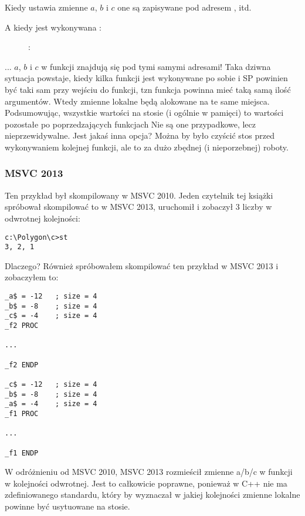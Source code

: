 Kiedy  ustawia zmienne $a$, $b$ i $c$ one są zapisywane pod adresem , itd.

\clearpage
A kiedy jest wykonywana :

\begin{figure}[H]
\centering
{}
\caption{\olly: }
\label{fig:stack_noise_olly2}
\end{figure}

... $a$, $b$ i $c$ w funkcji  znajdują się pod tymi samymi adresami!
Taka dziwna sytuacja powstaje, kiedy kilka funkcji jest wykonywane po sobie
i \ac{SP} powinien być taki sam przy wejściu do funkcji, tzn funkcja powinna mieć taką samą ilość argumentów. 
Wtedy zmienne lokalne będą alokowane na te same miejsca.
Podsumowując, wszystkie wartości na stosie (i ogólnie w pamięci) to wartości pozostałe po poprzedzających funkcjach
Nie są one przypadkowe, lecz nieprzewidywalne.
Jest jakaś inna opcja?
Można by było czyścić stos przed wykonywaniem kolejnej funkcji,
ale to za dużo zbędnej (i nieporzebnej) roboty.

\subsubsection{MSVC 2013}

Ten przykład był skompilowany w MSVC 2010.
Jeden czytelnik tej książki spróbował skompilować to w MSVC 2013, uruchomił i zobaczył 3 liczby w odwrotnej kolejności:

\begin{lstlisting}
c:\Polygon\c>st
3, 2, 1
\end{lstlisting}

Dlaczego?
Również spróbowałem skompilować ten przykład w MSVC 2013 i zobaczyłem to:

\begin{lstlisting}[caption=MSVC 2013,style=customasmx86]
_a$ = -12	; size = 4
_b$ = -8	; size = 4
_c$ = -4	; size = 4
_f2	PROC

...

_f2	ENDP

_c$ = -12	; size = 4
_b$ = -8	; size = 4
_a$ = -4	; size = 4
_f1	PROC

...

_f1	ENDP
\end{lstlisting}

W odróżnieniu od MSVC 2010, MSVC 2013 rozmieścił zmienne a/b/c w funkcji  w kolejności odwrotnej.
Jest to całkowicie poprawne, ponieważ w C++ nie ma zdefiniowanego standardu, który by wyznaczał w jakiej kolejności zmienne lokalne powinne być usytuowane na stosie.


